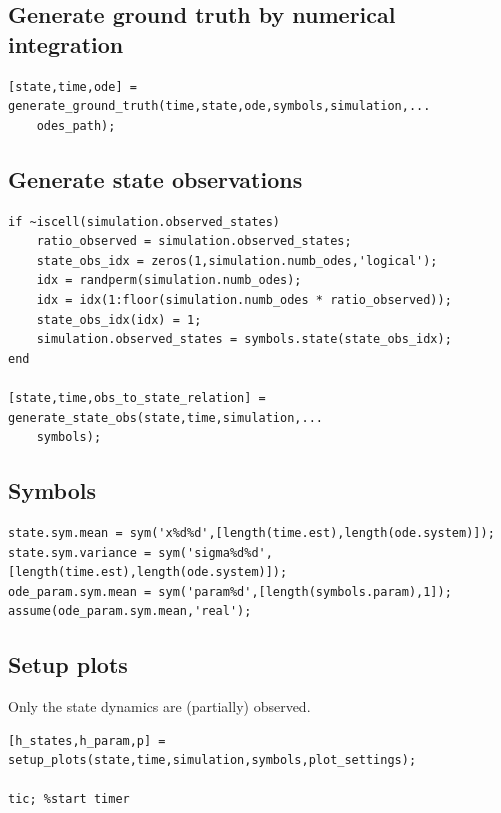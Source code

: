 \begin{par}
\subsection{ Generate ground truth by numerical integration }
\end{par} \vspace{1em}
\color{RoyalPurple}\begin{verbatim}
[state,time,ode] = generate_ground_truth(time,state,ode,symbols,simulation,...
    odes_path);
\end{verbatim}
\color{black}
\begin{par}
\subsection{ Generate state observations }
\end{par} \vspace{1em}
\color{RoyalPurple}\begin{verbatim}
if ~iscell(simulation.observed_states)
    ratio_observed = simulation.observed_states;
    state_obs_idx = zeros(1,simulation.numb_odes,'logical');
    idx = randperm(simulation.numb_odes);
    idx = idx(1:floor(simulation.numb_odes * ratio_observed));
    state_obs_idx(idx) = 1;
    simulation.observed_states = symbols.state(state_obs_idx);
end

[state,time,obs_to_state_relation] = generate_state_obs(state,time,simulation,...
    symbols);
\end{verbatim}
\color{black}
\begin{par}
\subsection{ Symbols }
\end{par} \vspace{1em}
\color{RoyalPurple}\begin{verbatim}
state.sym.mean = sym('x%d%d',[length(time.est),length(ode.system)]);
state.sym.variance = sym('sigma%d%d',[length(time.est),length(ode.system)]);
ode_param.sym.mean = sym('param%d',[length(symbols.param),1]);
assume(ode_param.sym.mean,'real');
\end{verbatim}
\color{black}
\begin{par}
\subsection{ Setup plots }
\end{par} \vspace{1em}
\begin{par}
Only the state dynamics are (partially) observed.
\end{par} \vspace{1em}
\color{RoyalPurple}\begin{verbatim}
[h_states,h_param,p] = setup_plots(state,time,simulation,symbols,plot_settings);

tic; %start timer
\end{verbatim}
\color{black}

